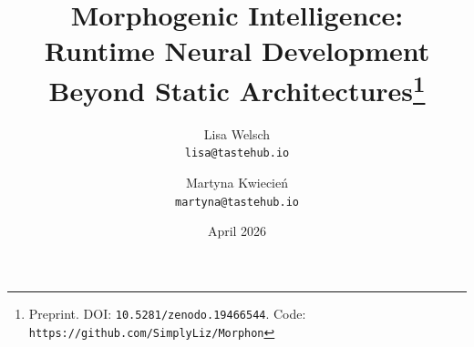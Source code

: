 \documentclass[10pt]{article}
\title{\textbf{Morphogenic Intelligence:\\
Runtime Neural Development Beyond Static Architectures}\thanks{Preprint. DOI: \texttt{10.5281/zenodo.19466544}. Code: \texttt{https://github.com/SimplyLiz/Morphon}}}
\author{
  Lisa Welsch\\\texttt{lisa@tastehub.io}
  \and
  Martyna Kwiecie\'n\\\texttt{martyna@tastehub.io}
}
\date{April 2026}
\begin{document}
\maketitle

\begin{abstract}

\end{abstract}












\end{document}
